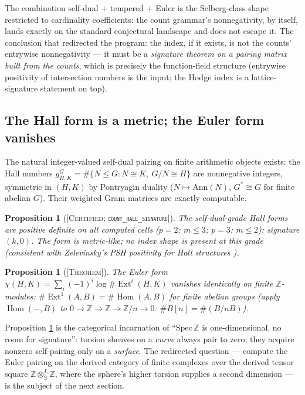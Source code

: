 \documentclass[11pt,reqno]{amsart}
\theoremstyle{plain}
\newtheorem{proposition}[theorem]{Proposition}
\theoremstyle{definition}
\theoremstyle{remark}
\newcommand{\Z}{\mathbb{Z}}
\newcommand{\Sph}{\mathbb{S}}
\newcommand{\grade}[1]{\textup{[\textsc{#1}]}}
\DeclareMathOperator{\Hom}{Hom}
\DeclareMathOperator{\Ext}{Ext}
\begin{document}
The combination self-dual $+$ tempered $+$ Euler is the Selberg-class shape restricted to
cardinality coefficients: the count grammar's nonnegativity, by itself, lands exactly on the
standard conjectural landscape and does not escape it. The conclusion that redirected the
program: the index, if it exists, is not the counts' entrywise nonnegativity --- it must be a
\emph{signature theorem on a pairing matrix built from the counts}, which is precisely the
function-field structure (entrywise positivity of intersection numbers is the input; the
Hodge index is a lattice-signature statement on top).

\subsection{The Hall form is a metric; the Euler form vanishes}\label{subsec:hall}

The natural integer-valued self-dual pairing on finite arithmetic objects exists: the Hall
numbers $g^G_{H,K} = \#\{N \le G : N \cong K,\ G/N \cong H\}$ are nonnegative integers,
symmetric in $(H, K)$ by Pontryagin duality ($N \mapsto \mathrm{Ann}(N)$, $G^* \cong G$ for
finite abelian $G$). Their weighted Gram matrices are exactly computable.

\begin{proposition}[\grade{Certified; \texttt{count\_\allowbreak hall\_\allowbreak signature}}]\label{prop:hall}
The self-dual-grade Hall forms are positive definite on all computed cells
($p = 2$: $m \le 3$; $p = 3$: $m \le 2$): signature $(k, 0)$. The form is metric-like; no
index shape is present at this grade (consistent with Zelevinsky's PSH positivity for Hall
structures \cite{Zelevinsky81}).
\end{proposition}

\begin{proposition}[\grade{Theorem}]\label{prop:eulervanish}
The Euler form $\chi(H, K) = \sum_i (-1)^i \log\#\Ext^i(H, K)$ vanishes identically on finite
$\Z$-modules: $\#\Ext^1(A, B) = \#\Hom(A, B)$ for finite abelian groups (apply $\Hom(-, B)$
to $0 \to \Z \to \Z \to \Z/n \to 0$: $\#B[n] = \#(B/nB)$).
\end{proposition}

Proposition \ref{prop:eulervanish} is the categorical incarnation of ``$\mathrm{Spec}\,\Z$ is
one-dimensional, no room for signature'': torsion sheaves on a \emph{curve} always pair to
zero; they acquire nonzero self-pairing only on a \emph{surface}. The redirected question ---
compute the Euler pairing on the derived category of finite complexes over the derived tensor
square $\Z \otimes^{L}_{\Sph} \Z$, where the sphere's higher torsion supplies a second
dimension --- is the subject of the next section.
\end{document}
